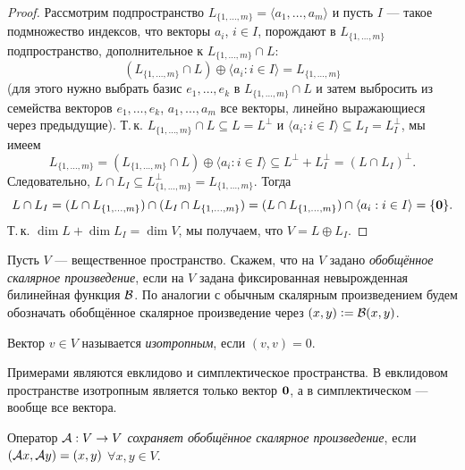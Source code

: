 \begin{proof}
    Рассмотрим подпространство $L_{\{1, \ldots, m\}} = \langle a_1, \ldots, a_m\rangle$ и пусть $I$ --- такое подмножество индексов, что векторы $a_i$, $i \in I$, порождают в $L_{\{1, \ldots, m\}}$ подпространство, дополнительное к $L_{\{1, \ldots, m\}} \cap L$:
    \[
        (L_{\{1, \ldots, m\}} \cap L) \oplus \langle a_i : i \in I\rangle = L_{\{1, \ldots, m\}}
    \]
    (для этого нужно выбрать базис $e_1, \ldots, e_k$ в $L_{\{1, \ldots, m\}} \cap L$ и затем выбросить из семейства векторов $e_1, \ldots, e_k$, $a_1, \ldots, a_m$ все векторы, линейно выражающиеся через предыдущие). Т.\,к. $L_{\{1, \ldots, m\}} \cap L \subseteq L = L^\perp$ и $\langle a_i : i \in I\rangle \subseteq L_I = L_I^\perp$, мы имеем
    \[
        L_{\{1, \ldots, m\}} = (L_{\{1, \ldots, m\}} \cap L) \oplus \langle a_i : i \in I\rangle \subseteq L^\perp + L_I^\perp = (L \cap L_I)^\perp.
    \]
    Следовательно, $L \cap L_I \subseteq L_{\{1, \ldots, m\}}^\perp = L_{\{1, \ldots, m\}}$. Тогда
    \[
        L \cap L_I = (L \cap L_{\{1, \ldots, m\}}) \cap (L_I \cap L_{\{1, \ldots, m\}}) = (L \cap L_{\{1, \ldots, m\}}) \cap \langle a_i : i \in I\rangle = \{\boldsymbol{0}\}.
    \]
    Т.\,к. $\dim L + \dim L_I = \dim V$, мы получаем, что $V = L \oplus L_I$.
\end{proof}

\begin{definition}
    Пусть $V$ --- вещественное пространство. Скажем, что на $V$ задано \textit{обобщённое скалярное произведение}, если на $V$ задана фиксированная невырожденная билинейная функция $\mathcal{B}$. По аналогии с обычным скалярным произведением будем обозначать обобщённое скалярное произведение через $(x, y) \vcentcolon = \mathcal{B}(x, y)$.
\end{definition}

\begin{definition}
    Вектор $v \in V$ называется \textit{изотропным}, если $(v, v) = 0$.
\end{definition}

Примерами являются евклидово и симплектическое пространства. В евклидовом пространстве изотропным является только вектор $\boldsymbol{0}$, а в симплектическом --- вообще все вектора.

\begin{definition}
    Оператор $\mathcal{A}: V \to V$ \textit{сохраняет обобщённое скалярное произведение}, если $(\mathcal{A} x, \mathcal{A} y) = (x, y)$ $\forall x, y \in V$.
\end{definition}

